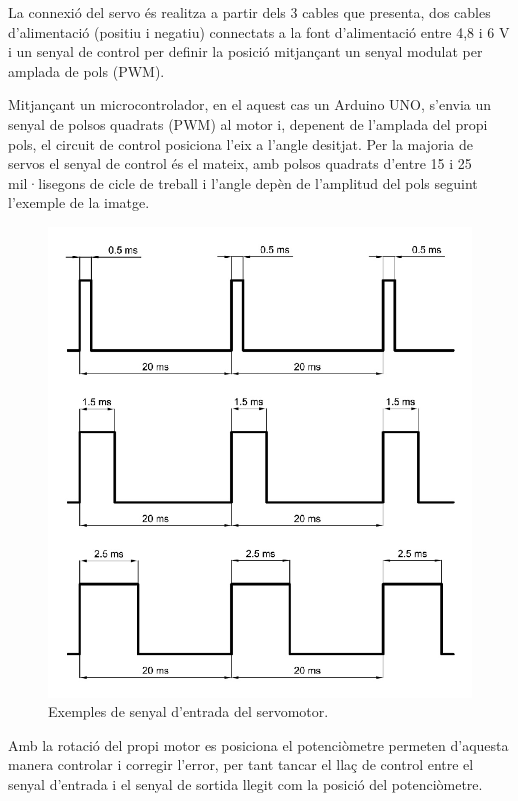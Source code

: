 La connexió del servo és realitza a partir dels 3 cables que presenta, dos cables d'alimentació (positiu i negatiu) connectats a la font d’alimentació entre 4,8 i 6 V i un senyal de control per definir la posició mitjançant un senyal modulat per amplada de pols (PWM).

Mitjançant un microcontrolador, en el aquest cas un Arduino UNO, s’envia un senyal de polsos quadrats (PWM) al motor i, depenent de l’amplada del propi pols, el circuit de control posiciona l’eix a l’angle desitjat. Per la majoria de servos el senyal de control és el mateix, amb polsos quadrats d’entre 15 i 25 mil·lisegons de cicle de treball i l’angle depèn de l’amplitud del pols seguint l’exemple de la imatge. 
\begin{figure}[H]
	\centering
	\includegraphics[scale=0.5]{entrada-servo.png}
	\caption{Exemples de senyal d'entrada del servomotor.}
	\label{fig:entradaservo}
\end{figure}

Amb la rotació del propi motor es posiciona el potenciòmetre permeten d’aquesta manera controlar i corregir l’error, per tant tancar el llaç de control entre el senyal d’entrada i el senyal de sortida llegit com la posició del potenciòmetre. 


